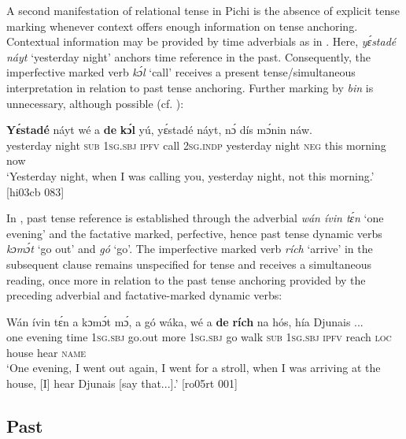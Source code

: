 A second manifestation of relational tense in Pichi is the absence of explicit tense marking whenever context offers enough information on tense anchoring. Contextual information may be provided by time adverbials as in . Here, \textit{yɛ́stadé náyt} ‘yesterday night’ anchors time reference in the past. Consequently, the imperfective marked verb \textit{kɔ́l} ‘call’ receives a present tense/simultaneous interpretation in relation to past tense anchoring. Further marking by \textit{bin} is unnecessary, although possible (cf. ):


\ea%
    \label{ex:key:376}
    \gll \textbf{Yɛ́stadé}    náyt  wé  a    \textbf{de}  \textbf{kɔ́l}  yú,    yɛ́stadé    náyt,
nɔ́  dís  mɔ́nin  náw.\\
yesterday  night  \textsc{sub}  \textsc{1sg.sbj}  \textsc{ipfv}  call  \textsc{2sg.indp}  yesterday  night
\textsc{neg}  this  morning  now\\

\glt ‘Yesterday night, when I was calling you, yesterday night,
not this morning.’ [hi03cb 083]
\z

In , past tense reference is established through the adverbial \textit{wán ívin tɛ́n} ‘one evening’ and the factative marked, perfective, hence past tense dynamic verbs \textit{kɔmɔ́t} ‘go out’ and \textit{gó} ‘go’. The imperfective marked verb \textit{rích} ‘arrive’ in the subsequent clause remains unspecified for tense and receives a simultaneous reading, once more in relation to the past tense anchoring provided by the preceding adverbial and factative-marked dynamic verbs:


\ea%
    \label{ex:key:377}
    \gll Wán    ívin    tɛ́n    a    kɔmɔ́t  mɔ́,    a    gó  wáka,
wé  a    \textbf{de} \textbf{rích}   na  hós,    hía    Djunais  \op...\cp{}\\
one    evening  time    \textsc{1sg.sbj}  go.out  more  \textsc{1sg.sbj}  go  walk
\textsc{sub}  \textsc{1sg.sbj}  \textsc{ipfv}  reach  \textsc{loc}  house  hear    \textsc{name}\\

\glt ‘One evening, I went out again, I went for a stroll, when I was arriving 
at the house, [I] hear Djunais [say that...].’ [ro05rt 001]
\z

\subsection{Past}\label{sec:6.5.2}

